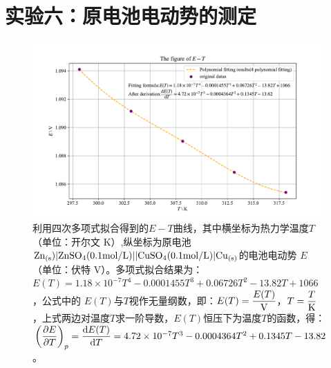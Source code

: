 \documentclass[UTF8,AutoFakeBold,a4paper]{article}
\begin{document}
	
	\section{}
	\section{}
	\section{}
	
	\section{实验六：原电池电动势的测定}
	\begin{figure}[h]
	\centering
	\includegraphics[scale=0.63]{6}
	\caption{利用四次多项式拟合得到的$E-T$曲线，其中横坐标为热力学温度$T$（单位：开尔文 K）,纵坐标为原电池$\ce{Zn}_{(\rm{s}})|\ce{ZnSO4}(0.1\rm{mol}/L)||\ce{CuSO4}(0.1\rm{mol/L})|\ce{Cu}_{(\rm{s})}$的电池电动势 $E$（单位：伏特 V）。多项式拟合结果为：\textcolor[rgb]{0.54,0.13,0.33}{$E(T) =1.18\times 10^{-7} T^{4} - 0.0001455 T^{3} + 0.06726 T^{2} - 13.82 T + 1066$}，公式中的 $E(T)$与$T$视作无量纲数，即：$E(T) = \dfrac{E(T)}{\ce{V}}$，$T = \dfrac{T}{\ce{K}}$，上式两边对温度$T$求一阶导数，$E(T)$恒压下为温度$T$的函数，得：\textcolor[rgb]{0.54,0.13,0.33}{$\pqty{\dfrac{\partial E}{\partial T}}_{p} = \dfrac{{\rm{d}}E(T)}{{\rm{d}}T} = 4.72\times 10^{-7} T^{3} - 0.0004364 T^{2} + 0.1345 T - 13.82$}。}
	\label{fi1}
\end{figure}
\newpage
\end{document}
